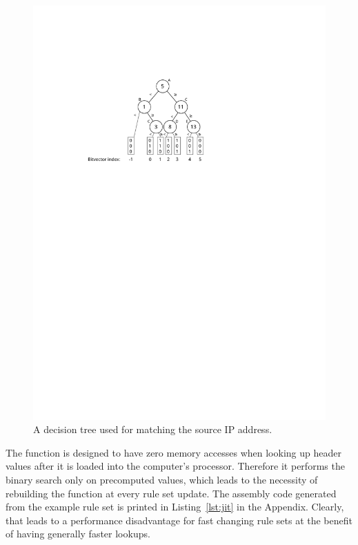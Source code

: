 \documentclass[a4paper,
		12pt,
		parskip=full,
		titlepage
		]{scrartcl}
\begin{document}
\begin{figure}
\centering
\includegraphics[height=0.35\textheight]{images/bv-tree}
\caption{A decision tree used for matching the source IP address.}
\label{fig:bv-tree}
\end{figure}

The function is designed to have zero memory accesses when looking up header 
values after it is loaded into the computer's processor.
Therefore it performs the binary search only on precomputed values, which 
leads to the necessity of rebuilding the function at every rule set update.
The assembly code generated from the example rule set is printed in Listing~\ref{lst:jit} in the Appendix.
Clearly, that leads to a performance disadvantage for fast changing rule sets at the benefit of having generally faster lookups.
\end{document}
